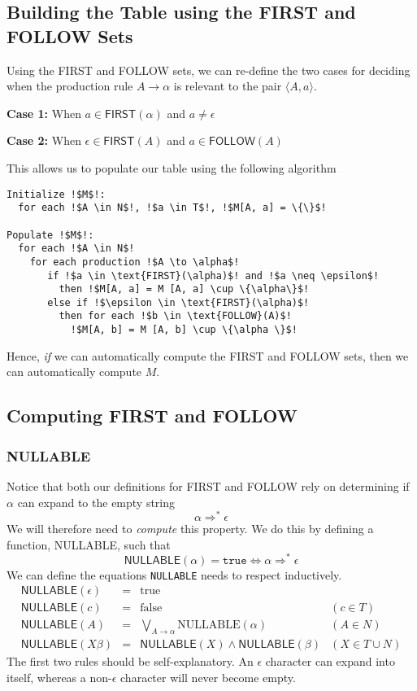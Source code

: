 \subsection{Building the Table using the FIRST and FOLLOW Sets}\label{section:building-the-table-using-first-follow}
Using the \textsf{FIRST} and \textsf{FOLLOW} sets, we can re-define the two cases for deciding when the production rule $A \rightarrow \alpha$ is relevant to the pair $\langle A, a \rangle$.

\textbf{Case 1:} When $a \in \textsf{FIRST}(\alpha)$ and $a \neq \epsilon$

\textbf{Case 2:} When $\epsilon \in \textsf{FIRST}(A)$ and $a \in \textsf{FOLLOW}(A)$

This allows us to populate our table using the following algorithm

\begin{lstlisting}[style=pseudocode]
Initialize !$M$!:
  for each !$A \in N$!, !$a \in T$!, !$M[A, a] = \{\}$!

Populate !$M$!:
  for each !$A \in N$!
    for each production !$A \to \alpha$!
       if !$a \in \text{FIRST}(\alpha)$! and !$a \neq \epsilon$!
         then !$M[A, a] = M [A, a] \cup \{\alpha\}$!
       else if !$\epsilon \in \text{FIRST}(\alpha)$!
         then for each !$b \in \text{FOLLOW}(A)$!
           !$M[A, b] = M [A, b] \cup \{\alpha \}$!
\end{lstlisting}

Hence, \textit{if} we can automatically compute the \textsf{FIRST} and \textsf{FOLLOW} sets, then we can automatically compute $M$.

\subsection{Computing FIRST and FOLLOW}\label{section:computing-first-follow}
\subsubsection{NULLABLE}
Notice that both our definitions for \textsf{FIRST} and \textsf{FOLLOW} rely on determining if $\alpha$ can expand to the empty string
\[\alpha \Rightarrow^* \epsilon\]
We will therefore need to \textit{compute} this property. We do this by defining a function, \textsf{NULLABLE}, such that 
\[\textsf{NULLABLE}(\alpha) = \texttt{true} \iff \alpha \Rightarrow^* \epsilon\]
We can define the equations \texttt{NULLABLE} needs to respect inductively.
\[
\begin{array}{lcll}
\textsf{NULLABLE}(\epsilon) &=& \text{true}\\[1ex]
\textsf{NULLABLE}(c) &=& \text{false} & (c \in T)\\[1ex]
\textsf{NULLABLE}(A) &=& \bigvee_{A \to \alpha} \text{NULLABLE}(\alpha) & (A \in N)\\[1ex]
\textsf{NULLABLE}(X\beta) &=& \textsf{NULLABLE}(X) \wedge \textsf{NULLABLE}(\beta) & (X \in T \cup N)
\end{array}
\]
The first two rules should be self-explanatory. An $\epsilon$ character can expand into itself, whereas a non-$\epsilon$ character will never become empty.

